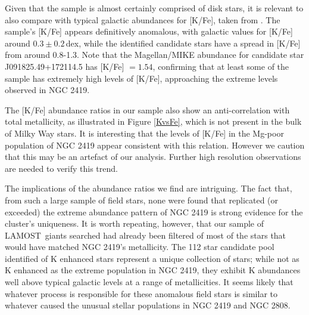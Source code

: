 \documentclass[a4paper,fleqn,usenatbib]{mnras}
\newcommand{\todo}[1]{\textcolor{red}{#1}}
\newcommand{\project}[1]{#1}
\newcommand{\lamost}{\project{LAMOST}}
\begin{document}
Given that the sample is almost certainly comprised of disk stars, it is relevant to also compare with typical galactic abundances for [K/Fe], taken from \cite{kobayashi2011}. The sample's [K/Fe] appears definitively anomalous, with galactic values for [K/Fe] around $0.3 \pm 0.2$\,dex, while the identified candidate stars have a spread in [K/Fe] from around 0.8-1.3. Note that the Magellan/MIKE abundance for candidate star J091825.49+172114.5 has [K/Fe] $=1.54$, confirming that at least some of the sample has extremely high levels of [K/Fe], approaching the extreme levels observed in NGC 2419.

The [K/Fe] abundance ratios in our sample also show an anti-correlation with total metallicity, as illustrated in Figure \ref{KvsFe}, which is not present in the bulk of Milky Way stars. It is interesting that the levels of [K/Fe] in the Mg-poor population of NGC 2419 appear consistent with this relation. However we caution that this may be an artefact of our analysis. Further high resolution observations are needed to verify this trend.




The implications of the abundance ratios we find are intriguing. The fact that, from such a large sample of field stars, none were found that replicated (or exceeded) the extreme abundance pattern of NGC 2419 is strong evidence for the cluster's uniqueness.
It is worth repeating, however, that our sample of \lamost\ giants searched had already been filtered of most of the stars that would have matched NGC 2419's metallicity. The 112 star candidate pool identified of K enhanced stars represent a unique collection of stars; while not as K enhanced as the extreme population in NGC 2419, they exhibit K abundances well above typical galactic levels at a range of metallicities. It seems likely that whatever process is responsible for these anomalous field stars is similar to whatever caused the unusual stellar populations in NGC 2419 and NGC 2808.
\end{document}
